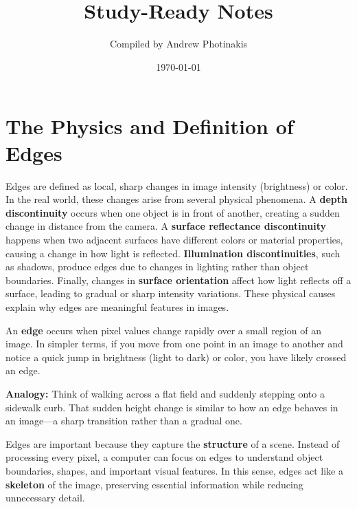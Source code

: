 \documentclass[12pt]{article}
\title{\TOPICTITLE\\\large Study-Ready Notes}
\author{Compiled by Andrew Photinakis}
\date{\today}
\begin{document}
\maketitle
\tableofcontents
\newpage

\section{The Physics and Definition of Edges}
Edges are defined as local, sharp changes in image intensity (brightness) or color. In the real world, these changes arise from several physical phenomena. A \textbf{depth discontinuity} occurs when one object is in front of another, creating a sudden change in distance from the camera. A \textbf{surface reflectance discontinuity} happens when two adjacent surfaces have different colors or material properties, causing a change in how light is reflected. \textbf{Illumination discontinuities}, such as shadows, produce edges due to changes in lighting rather than object boundaries. Finally, changes in \textbf{surface orientation} affect how light reflects off a surface, leading to gradual or sharp intensity variations. These physical causes explain why edges are meaningful features in images.

An \textbf{edge} occurs when pixel values change rapidly over a small region of an image. In simpler terms, if you move from one point in an image to another and notice a quick jump in brightness (light to dark) or color, you have likely crossed an edge.

\textbf{Analogy:}
Think of walking across a flat field and suddenly stepping onto a sidewalk curb. That sudden height change is similar to how an edge behaves in an image—a sharp transition rather than a gradual one.

Edges are important because they capture the \textbf{structure} of a scene. Instead of processing every pixel, a computer can focus on edges to understand object boundaries, shapes, and important visual features. In this sense, edges act like a \textbf{skeleton} of the image, preserving essential information while reducing unnecessary detail.
\end{document}
